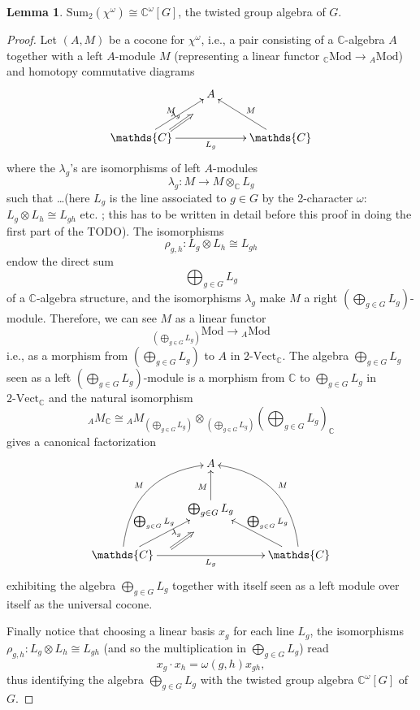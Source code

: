 \documentclass[12pt]{scrartcl}
\newcommand{\C}{\mathds{C}}
\theoremstyle{definition}
\newtheorem{lemma}[definition]{Lemma}
\numberwithin{equation}{section}
\numberwithin{definition}{section}
\numberwithin{figure}{section}
\begin{document}
\begin{lemma}\label{lemma:cocone-is-coinvariants}
$\text{Sum}_2(\chi^\omega) \cong \C^\omega[G]$, the  twisted group algebra of $G$.
\end{lemma}

\begin{proof}
Let $(A,M)$ be a cocone for $\chi^\omega$, i.e., a pair consisting of a $\C$-algebra $A$ together with a left $A$-module $M$ (representing a linear functor ${}_\C\mathrm{Mod}\to {}_A\mathrm{Mod}$) and homotopy commutative diagrams
\[
\xymatrix{
&A\\
\C\ar[rr]_{L_g}\ar[ur]^{M}&&\C\ar[lu]_M
\ar@{=>}^{\lambda_g}(9,-11);(16,-6)}
\]
where the $\lambda_g$'s are isomorphisms of left $A$-modules
\[
\lambda_g\colon M\to M\otimes_\C L_g
\]
such that \dots (here $L_g$ is the line associated to $g\in G$ by the 2-character $\omega$: $L_g\otimes L_h\cong L_{gh}$ etc. ; this has to be written in detail before this proof in doing the first part of the TODO). The isomorphisms 
\[
\rho_{g,h}\colon L_g\otimes L_h\cong L_{gh}
\]
endow the direct sum
\[
\bigoplus_{g\in G} L_g
\]
of a $\C$-algebra structure, and the isomorphisms $\lambda_g$ make $M$ a right $(\bigoplus_{g\in G} L_g)$-module. Therefore, we can see $M$ as a linear functor 
\[
{}_{(\bigoplus_{g\in G} L_g)}\mathrm{Mod}\to {}_A\mathrm{Mod}
\]
i.e., as a morphism from $(\bigoplus_{g\in G} L_g)$ to $A$ in $2\text{-}\mathrm{Vect}_\C$. The algebra $\bigoplus_{g\in G} L_g$ seen as a left $(\bigoplus_{g\in G} L_g)$-module is a morphism from $\C$ to $\bigoplus_{g\in G} L_g$ in $2\text{-}\mathrm{Vect}_\C$ and the natural isomorphism
\[
{}_AM_\C\cong {}_AM_{(\bigoplus_{g\in G} L_g)}\otimes {}_{(\bigoplus_{g\in G} L_g)}(\bigoplus_{g\in G} L_g)_\C
\]
gives a canonical factorization
\[
\xymatrix{
&A\\
&\bigoplus_{g\in G} L_g\ar[u]^{M}\\
\C\ar[rr]_{L_g}\ar[ur]^{\bigoplus_{g\in G} L_g}\ar@/^2pc/[ruu]^{M}&&\C\ar[lu]_{\bigoplus_{g\in G} L_g}\ar@/_2pc/[luu]_{M}
\ar@{=>}^{\lambda_g}(15,-26);(22,-21)}
\]
exhibiting the algebra $\bigoplus_{g\in G} L_g$ together with itself seen as a left module over itself as the universal cocone. 

Finally notice that choosing a linear basis $x_g$ for each line $L_g$, the isomorphisms  $\rho_{g,h}\colon L_g\otimes L_h\cong L_{gh}$ (and so the multiplication in $\bigoplus_{g\in G} L_g$) read
\[
x_g\cdot x_h = \omega(g,h)x_{gh},
\]
thus identifying the algebra $\bigoplus_{g\in G} L_g$ with the twisted group algebra $\C^\omega[G]$ of $G$.
\end{proof}
\end{document}
